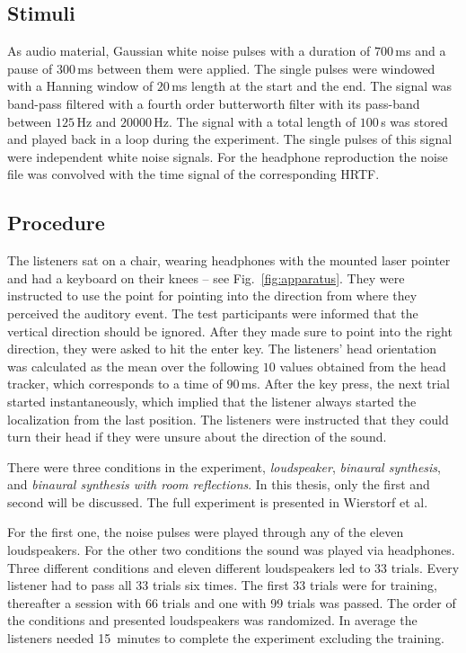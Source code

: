\subsection{Stimuli}
%
As audio material, Gaussian white noise pulses with a duration of $700$\,ms and
a
pause of $300$\,ms between them were applied. The single pulses were windowed
with a Hanning window of $20$\,ms length at the start and the end.
The signal was band-pass filtered with a fourth order butterworth filter with
its pass-band between $125$\,Hz and $20000$\,Hz.
The signal with a total length of $100$\,s was stored and played back in a loop
during the experiment. The single pulses of this signal were independent white noise
signals.
For the headphone reproduction the noise file was convolved with the time signal
of the corresponding \ac{HRTF}.

\subsection{Procedure}
%
The listeners sat on a chair, wearing headphones with the mounted laser
pointer and had a keyboard on their knees -- see Fig.~\ref{fig:apparatus}.
They were instructed to use the point for pointing into the direction from where
they perceived the auditory event.
The test participants were informed that the vertical direction should be
ignored. After they made sure to point into the right direction, they were asked
to hit the enter key.
The listeners' head orientation was calculated as the mean over the
following $10$
values obtained from
the head tracker, which corresponds to a time of $90$\,ms.
After the key press, the next trial started instantaneously, which implied that
the listener always started the localization from the last position.
The listeners were instructed that they could turn their head if they were unsure
about the direction of the sound.

There were three conditions in the experiment, \emph{loudspeaker}, 
\emph{binaural synthesis}, and \emph{binaural synthesis with room reflections}.
In this thesis, only the first and second will be discussed. The full experiment is presented
in Wierstorf et al.\autocite{Wierstorf2012b}

For the first one, the noise pulses were
played through any of the eleven loudspeakers. For the other two conditions the sound
was played via headphones. Three different conditions and eleven
different loudspeakers led to 33 trials.
Every listener had to pass all 33 trials six
times. The first 33 trials were for training, thereafter a session with 66
trials and one with 99 trials was passed. The order of the
conditions and presented loudspeakers was randomized.
In average the listeners needed 15~minutes to complete the experiment
excluding the training.

